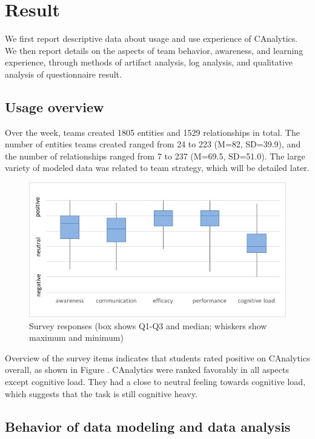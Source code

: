 \section{Result}\label{result}

We first report descriptive data about usage and use experience of
CAnalytics. We then report details on the aspects of team behavior,
awareness, and learning experience, through methods of artifact
analysis, log analysis, and qualitative analysis of questionnaire
result.

\subsection{Usage overview}\label{usage-overview}

Over the week, teams created 1805 entities and 1529 relationships in
total. The number of entities teams created ranged from 24 to 223 (M=82,
SD=39.9), and the number of relationships ranged from 7 to 237 (M=69.5,
SD=51.0). The large variety of modeled data was related to team
strategy, which will be detailed later.

\begin{figure}
\centering
\includegraphics{./img/survey_boxchart.jpg}
\caption{Survey responses (box shows Q1-Q3 and median; whiskers show
maximum and minimum)}\label{fig:survey}
\end{figure}

Overview of the survey items indicates that students rated positive on
CAnalytics overall, as shown in Figure \autocite{fig:survey}. CAnalytics
were ranked favorably in all aspects except cognitive load. They had a
close to neutral feeling towards cognitive load, which suggests that the
task is still cognitive heavy.

\subsection{Behavior of data modeling and data
analysis}\label{behavior-of-data-modeling-and-data-analysis}

